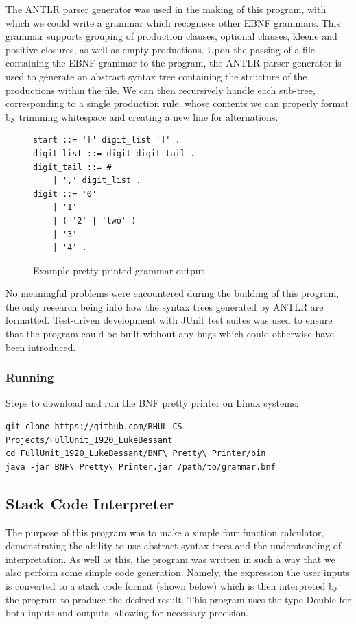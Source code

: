 \documentclass[a4paper, 11pt]{article}
\begin{document}
The ANTLR parser generator was used in the making of this program, with which we could write a grammar which recognises other EBNF grammars. This grammar supports grouping of production clauses, optional clauses, kleene and positive closures, as well as empty productions. Upon the passing of a file containing the EBNF grammar to the program, the ANTLR parser generator is used to generate an abstract syntax tree containing the structure of the productions within the file. We can then recursively handle each sub-tree, corresponding to a single production rule, whose contents we can properly format by trimming whitespace and creating a new line for alternations.

\begin{figure}[H]
\centering
\begin{BVerbatim}
start ::= '[' digit_list ']' .
digit_list ::= digit digit_tail . 
digit_tail ::= # 
	| ',' digit_list . 
digit ::= '0' 
	| '1' 
	| ( '2' | 'two' ) 
	| '3' 
	| '4' .
\end{BVerbatim}
\caption{Example pretty printed grammar output}
\end{figure}

No meaningful problems were encountered during the building of this program, the only research being into how the syntax trees generated by ANTLR are formatted. Test-driven development with JUnit test suites was used to ensure that the program could be built without any bugs which could otherwise have been introduced.
\subsubsection{Running}
Steps to download and run the BNF pretty printer on Linux systems:
\begin{verbatim}
git clone https://github.com/RHUL-CS-Projects/FullUnit_1920_LukeBessant
cd FullUnit_1920_LukeBessant/BNF\ Pretty\ Printer/bin
java -jar BNF\ Pretty\ Printer.jar /path/to/grammar.bnf
\end{verbatim}

\subsection{Stack Code Interpreter}
The purpose of this program was to make a simple four function calculator, demonstrating the ability to use abstract syntax trees and the understanding of interpretation. As well as this, the program was written in such a way that we also perform some simple code generation. Namely, the expression the user inputs is converted to a stack code format (shown below) which is then interpreted by the program to produce the desired result. This program uses the type Double for both inputs and outputs, allowing for necessary precision.
\end{document}
